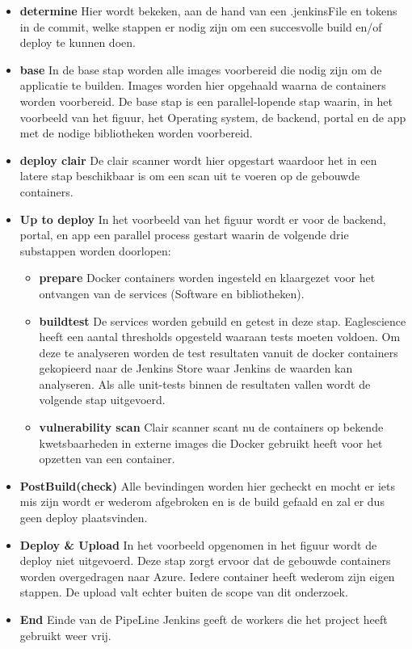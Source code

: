 \begin{itemize}
    \item \textbf{determine} Hier wordt bekeken, aan de hand van een .jenkinsFile en tokens in de commit, welke stappen er nodig zijn om een succesvolle build en/of deploy te kunnen doen.
    \item \textbf{base} In de base stap worden alle images voorbereid die nodig zijn om de applicatie te builden. Images worden hier opgehaald waarna de containers worden voorbereid. De base stap is een parallel-lopende stap waarin, in het voorbeeld van het figuur, het Operating system, de backend, portal en de app met de nodige bibliotheken worden voorbereid.
    \item \textbf{deploy clair} De clair scanner wordt hier opgestart waardoor het in een latere stap beschikbaar is om een scan uit te voeren op de gebouwde containers.
    \item \textbf{Up to deploy}
    In het voorbeeld van het figuur wordt er voor de backend, portal, en app een parallel process gestart waarin de volgende drie substappen worden doorlopen:
    \begin{itemize}
        \item \textbf{prepare} Docker containers worden ingesteld en klaargezet voor het ontvangen van de services (Software en bibliotheken).
        \item \textbf{buildtest} De services worden gebuild en getest in deze stap. Eaglescience heeft een aantal thresholds opgesteld waaraan tests moeten voldoen. Om deze te analyseren worden de test resultaten vanuit de docker containers gekopieerd naar de Jenkins Store waar Jenkins de waarden kan analyseren. Als alle unit-tests binnen de resultaten vallen wordt de volgende stap uitgevoerd.
        \item \textbf{vulnerability scan} Clair scanner scant nu de containers op bekende kwetsbaarheden in externe images die Docker gebruikt heeft voor het opzetten van een container.
    \end{itemize}
    \item \textbf{PostBuild(check)}
    Alle bevindingen worden hier gecheckt en mocht er iets mis zijn wordt er wederom afgebroken en is de build gefaald en zal er dus geen deploy plaatsvinden.
    \item \textbf{Deploy \& Upload}
    In het voorbeeld opgenomen in het figuur wordt de deploy niet uitgevoerd. Deze stap zorgt ervoor dat de gebouwde containers worden overgedragen naar Azure. Iedere container heeft wederom zijn eigen stappen. De upload valt echter buiten de scope van dit onderzoek.
    \item \textbf{End}
    Einde van de PipeLine Jenkins geeft de workers die het project heeft gebruikt weer vrij.
\end{itemize}


